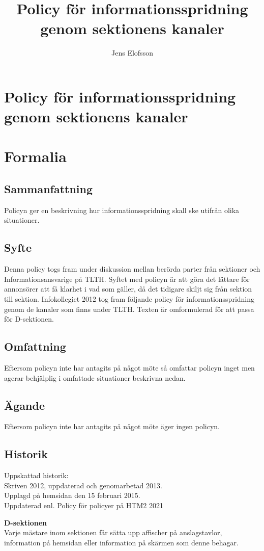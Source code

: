 \documentclass{dsekprotokoll}
\title{Policy för informationsspridning genom sektionens kanaler}
\author{Jens Elofsson}
\begin{document}
\section*{Policy för informationsspridning genom sektionens kanaler}
\section{Formalia}
\subsection{Sammanfattning}
Policyn ger en beskrivning hur informationsspridning skall ske utifrån olika situationer.
\subsection{Syfte}
Denna policy togs fram under diskussion mellan berörda parter från sektioner och Informationsansvarige på TLTH. Syftet med policyn är att göra det lättare för annonsörer att få klarhet i vad som gäller, då det tidigare skiljt sig från sektion till sektion. Infokollegiet 2012 tog fram följande policy för informationsspridning genom de kanaler som finns under TLTH. Texten är omformulerad för att passa för D-sektionen.

\subsection{Omfattning}
Eftersom policyn inte har antagits på något möte så omfattar policyn inget men agerar behjälplig i omfattade situationer beskrivna nedan.
\subsection{Ägande}
Eftersom policyn inte har antagits på något möte äger ingen policyn.
\subsection{Historik}
Uppskattad historik:\\
Skriven 2012, uppdaterad och genomarbetad 2013. \\
Upplagd på hemsidan den 15 februari 2015. \\
Uppdaterad enl. Policy för policyer på HTM2 2021


\textbf{D-sektionen}\\
Varje mästare inom sektionen får sätta upp affischer på anslagstavlor, information på
hemsidan eller information på skärmen som denne behagar.
\end{document}
